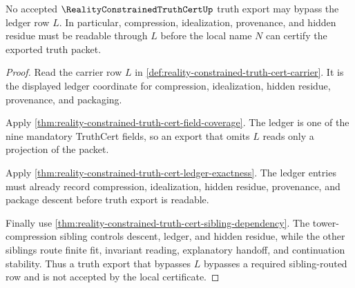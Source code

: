 \begin{theorem}
\label{thm:reality-constrained-truth-cert-ledger-nonescape}
No accepted $\RealityConstrainedTruthCertUp$ truth export may bypass the
ledger row $L$. In particular, compression, idealization, provenance, and
hidden residue must be readable through $L$ before the local name $N$ can
certify the exported truth packet.
\end{theorem}
\begin{proof}
Read the carrier row $L$ in
\autoref{def:reality-constrained-truth-cert-carrier}. It is the displayed
ledger coordinate for compression, idealization, hidden residue, provenance,
and packaging.

Apply \autoref{thm:reality-constrained-truth-cert-field-coverage}. The ledger
is one of the nine mandatory TruthCert fields, so an export that omits $L$
reads only a projection of the packet.

Apply \autoref{thm:reality-constrained-truth-cert-ledger-exactness}. The
ledger entries must already record compression, idealization, hidden residue,
provenance, and package descent before truth export is readable.

Finally use \autoref{thm:reality-constrained-truth-cert-sibling-dependency}.
The tower-compression sibling controls descent, ledger, and hidden residue,
while the other siblings route finite fit, invariant reading, explanatory
handoff, and continuation stability. Thus a truth export that bypasses $L$
bypasses a required sibling-routed row and is not accepted by the local
certificate.
\end{proof}

